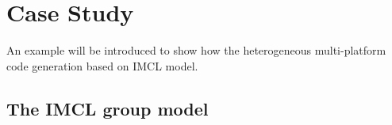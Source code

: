 \section{Case Study}
An example will be introduced to show how the heterogeneous multi-platform code generation based on IMCL model.

\subsection{The IMCL group model}

% 